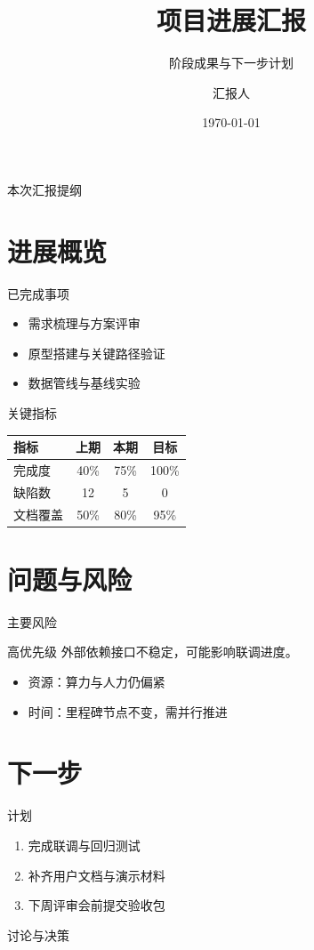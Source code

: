 \documentclass[UTF8,aspectratio=169,10pt]{ctexbeamer}
\title{项目进展汇报}
\subtitle{阶段成果与下一步计划}
\author{汇报人}
\institute{团队 / 部门}
\date{\today}
\begin{document}
\maketitle

\begin{frame}{本次汇报提纲}
  \tableofcontents
\end{frame}

\section{进展概览}

\begin{frame}{已完成事项}
  \begin{itemize}
    \item 需求梳理与方案评审
    \item 原型搭建与关键路径验证
    \item 数据管线与基线实验
  \end{itemize}
\end{frame}

\begin{frame}{关键指标}
  \begin{table}
    \centering
    \begin{tabular}{lccc}
      \toprule
      指标 & 上期 & 本期 & 目标 \\
      \midrule
      完成度 & 40\% & 75\% & 100\% \\
      缺陷数 & 12 & 5 & 0 \\
      文档覆盖 & 50\% & 80\% & 95\% \\
      \bottomrule
    \end{tabular}
  \end{table}
\end{frame}

\section{问题与风险}

\begin{frame}{主要风险}
  \begin{alertblock}{高优先级}
    外部依赖接口不稳定，可能影响联调进度。
  \end{alertblock}
  \begin{itemize}
    \item 资源：算力与人力仍偏紧
    \item 时间：里程碑节点不变，需并行推进
  \end{itemize}
\end{frame}

\section{下一步}

\begin{frame}{计划}
  \begin{enumerate}
    \item 完成联调与回归测试
    \item 补齐用户文档与演示材料
    \item 下周评审会前提交验收包
  \end{enumerate}
\end{frame}

\begin{frame}[standout]
  讨论与决策
\end{frame}
\end{document}

